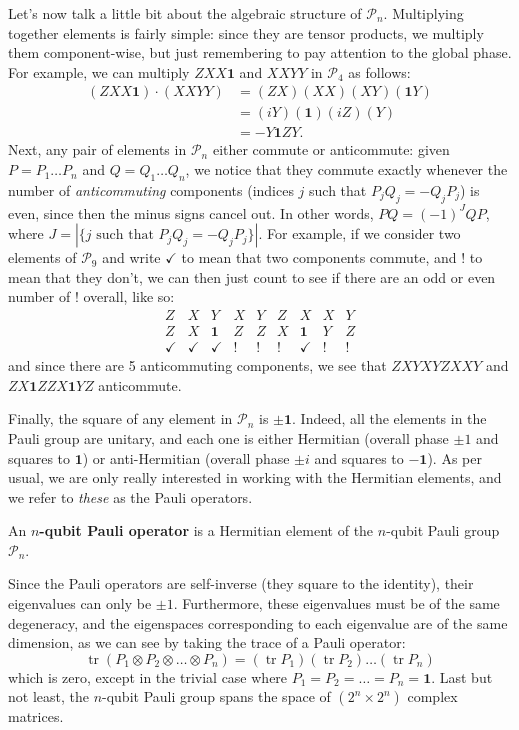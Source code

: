 \documentclass[fleqn,a4paper]{article}
\newenvironment{idea}{\everypar{\setlength{\parindent}{1.5em}}}{}
\theoremstyle{definition}
\theoremstyle{definition}
\theoremstyle{definition}
\theoremstyle{definition}
\theoremstyle{remark}
\begin{document}
Let's now talk a little bit about the algebraic structure of \(\mathcal{P}_n\).
Multiplying together elements is fairly simple: since they are tensor products, we multiply them component-wise, but just remembering to pay attention to the global phase.
For example, we can multiply \(ZXX\mathbf{1}\) and \(XXYY\) in \(\mathcal{P}_4\) as follows:
\[
  \begin{aligned}
    (ZXX\mathbf{1})\cdot(XXYY)
    &= (ZX)(XX)(XY)(\mathbf{1}Y)
  \\&= (iY)(\mathbf{1})(iZ)(Y)
  \\&= -Y\mathbf{1}ZY.
  \end{aligned}
\]
Next, any pair of elements in \(\mathcal{P}_n\) either commute or anticommute: given \(P=P_1\ldots P_n\) and \(Q=Q_1\ldots Q_n\), we notice that they commute exactly whenever the number of \emph{anticommuting} components (indices \(j\) such that \(P_jQ_j=-Q_jP_j\)) is even, since then the minus signs cancel out.
In other words, \(PQ=(-1)^J QP\), where \(J=|\{j\text{ such that }P_jQ_j=-Q_jP_j\}|\).
For example, if we consider two elements of \(\mathcal{P}_9\) and write \(\checkmark\) to mean that two components commute, and \(!\) to mean that they don't, we can then just count to see if there are an odd or even number of \(!\) overall, like so:
\[
  \begin{array}{ccccccccc}
    Z&X&Y&X&Y&Z&X&X&Y
  \\Z&X&\mathbf{1}&Z&Z&X&\mathbf{1}&Y&Z
  \\\hline
    \checkmark&\checkmark&\checkmark&!&!&!&\checkmark&!&!
  \end{array}
\]
and since there are 5 anticommuting components, we see that \(ZXYXYZXXY\) and \(ZX\mathbf{1}ZZX\mathbf{1}YZ\) anticommute.

Finally, the square of any element in \(\mathcal{P}_n\) is \(\pm\mathbf{1}\).
Indeed, all the elements in the Pauli group are unitary, and each one is either Hermitian (overall phase \(\pm1\) and squares to \(\mathbf{1}\)) or anti-Hermitian (overall phase \(\pm i\) and squares to \(-\mathbf{1}\)).
As per usual, we are only really interested in working with the Hermitian elements, and we refer to \emph{these} as the Pauli operators.

\begin{idea}
An \textbf{\(n\)-qubit Pauli operator} is a Hermitian element of the \(n\)-qubit Pauli group \(\mathcal{P}_n\).

\end{idea}

Since the Pauli operators are self-inverse (they square to the identity), their eigenvalues can only be \(\pm1\).
Furthermore, these eigenvalues must be of the same degeneracy, and the eigenspaces corresponding to each eigenvalue are of the same dimension, as we can see by taking the trace of a Pauli operator:
\[
  \operatorname{tr}(P_1\otimes P_2\otimes\ldots\otimes P_n) = (\operatorname{tr}P_1)(\operatorname{tr}P_2)\ldots(\operatorname{tr}P_n)
\]
which is zero, except in the trivial case where \(P_1=P_2=\ldots=P_n=\mathbf{1}\).
Last but not least, the \(n\)-qubit Pauli group spans the space of \((2^n\times 2^n)\) complex matrices.
\end{document}
